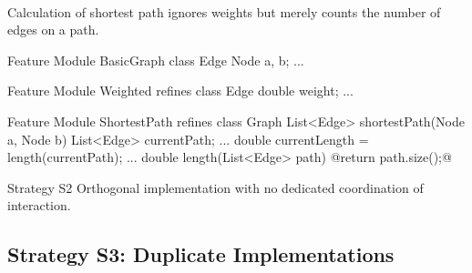 \begin{frame}[fragile]{\myframetitle}
	\begin{fancycolumns}[animation=none]
		\centering

		~
		\begin{note}{}
			Calculation of shortest path ignores weights but merely counts the number of edges on a path.
		\end{note}
	\nextcolumn
\begin{codetight}{Feature Module BasicGraph}
	class Edge { Node a, b; ... }
\end{codetight}	
\begin{codetight}{Feature Module Weighted}
	refines class Edge { double weight; ... }
\end{codetight}	
\begin{codetight}{Feature Module ShortestPath}
	refines class Graph {
		List<Edge> shortestPath(Node a, Node b){
			List<Edge> currentPath;
			... 
			double currentLength = length(currentPath);
			... 
		}
		double length(List<Edge> path) {
			@return path.size();@
		}
	}
\end{codetight}	
	\end{fancycolumns}
\end{frame}

\begin{frame}{\myframetitle}
	\begin{fancycolumns}[widths={30},animation=none]
		\begin{definition}{Strategy S2}
			Orthogonal implementation with no dedicated coordination of interaction.
		\end{definition}
		\nextcolumn
	\end{fancycolumns}
\end{frame}

\subsection{Strategy S3: Duplicate Implementations}



